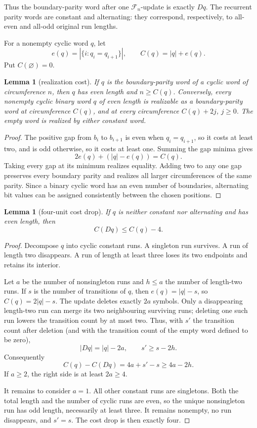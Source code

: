 \documentclass[11pt,a4paper]{amsart}
\newtheorem{lemma}[theorem]{Lemma}
\theoremstyle{definition}
\theoremstyle{remark}
\newcommand{\F}{\mathcal F}
\begin{document}
Thus the boundary-parity word after one \(\F_n\)-update is exactly \(Dq\).
The recurrent parity words are constant and alternating: they correspond,
respectively, to all-even and all-odd original run lengths.

For a nonempty cyclic word \(q\), let
\[
 e(q)=|\{i:q_i=q_{i+1}\}|,\qquad C(q)=|q|+e(q).
\]
Put \(C(\varnothing)=0\).

\begin{lemma}[realization cost]\label{lem:cost}
If \(q\) is the boundary-parity word of a cyclic word of circumference
\(n\), then \(q\) has even length and \(n\ge C(q)\).  Conversely, every
nonempty cyclic binary word \(q\) of even length is realizable as a
boundary-parity word at circumference \(C(q)\), and at every circumference
\(C(q)+2j\), \(j\ge0\).  The empty word is realized by either constant word.
\end{lemma}

\begin{proof}
The positive gap from \(b_i\) to \(b_{i+1}\) is even when
\(q_i=q_{i+1}\), so it costs at least two, and is odd otherwise, so it costs
at least one.  Summing the gap minima gives
\[
                 2e(q)+(|q|-e(q))=C(q).
\]
Taking every gap at its minimum realizes equality.  Adding two to any one
gap preserves every boundary parity and realizes all larger circumferences
of the same parity.  Since a binary cyclic word has an even number of
boundaries, alternating bit values can be assigned consistently between
the chosen positions.
\end{proof}

\begin{lemma}[four-unit cost drop]\label{lem:drop}
If \(q\) is neither constant nor alternating and has even length, then
\[
                            C(Dq)\le C(q)-4.
\]
\end{lemma}

\begin{proof}
Decompose \(q\) into cyclic constant runs.  A singleton run survives.  A
run of length two disappears.  A run of length at least three loses its two
endpoints and retains its interior.

Let \(a\) be the number of nonsingleton runs and \(h\le a\) the number of
length-two runs.  If \(s\) is the number of transitions of \(q\), then
\(e(q)=|q|-s\), so \(C(q)=2|q|-s\).  The update deletes exactly \(2a\)
symbols.  Only a disappearing length-two run can merge its two neighbouring
surviving runs; deleting one such run lowers the transition count by at most
two.  Thus, with \(s'\) the transition count after deletion (and with the
transition count of the empty word defined to be zero),
\[
 |Dq|=|q|-2a,\qquad s'\ge s-2h.
\]
Consequently
\[
 C(q)-C(Dq)=4a+s'-s\ge4a-2h.
\]
If \(a\ge2\), the right side is at least \(2a\ge4\).

It remains to consider \(a=1\).  All other constant runs are singletons.
Both the total length and the number of cyclic runs are even, so the unique
nonsingleton run has odd length, necessarily at least three.  It remains
nonempty, no run disappears, and \(s'=s\).  The cost drop is then exactly
four.
\end{proof}
\end{document}
